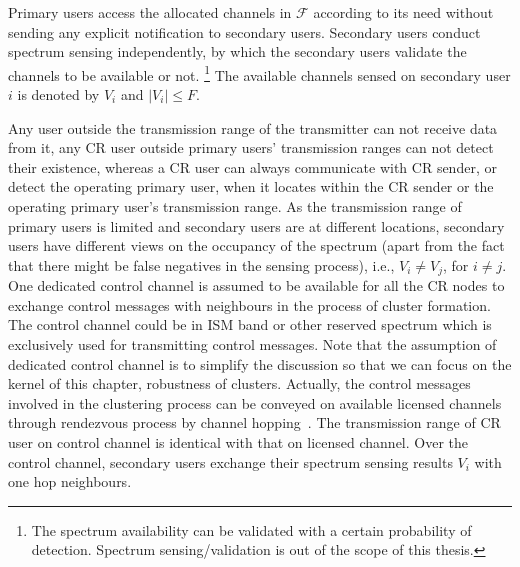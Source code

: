 Primary users access the allocated channels in $\mathcal{F}$ according to its need without sending any explicit notification to secondary users.
Secondary users conduct spectrum sensing independently, by which the secondary users validate the channels to be available or not. \footnote{The spectrum availability can be validated with a certain probability of detection. Spectrum sensing/validation is out of the scope of this thesis.}
The available channels sensed on secondary user $i$ is denoted by $V_i$ and $\vert V_i \vert \leq F$. %


Any user outside the transmission range of the transmitter can not receive data from it, \ie  any CR user outside primary users' transmission ranges can not detect their existence, whereas a CR user can always communicate with CR sender, or detect the operating primary user, when it locates within the CR sender or the operating primary user's transmission range.
As the transmission range of primary users is limited and secondary users are at different locations, secondary users have different views on the occupancy of the spectrum (apart from the fact that there might be false negatives in the sensing process), i.e., $V_i \neq V_j$, for $i \neq j$.
One dedicated control channel is assumed to be available for all the CR nodes to exchange control messages with neighbours in the process of cluster formation.
The control channel could be in ISM band or other reserved spectrum which is exclusively used for transmitting control messages.
Note that the assumption of dedicated control channel is to simplify the discussion so that we can focus on the kernel of this chapter, robustness of clusters.
Actually, the control messages involved in the clustering process can be conveyed on available licensed channels through rendezvous process by channel hopping~\cite{channelHopping_Rendezvous_2014, Gu_distributed_rendezvous_2014}. 
The transmission range of CR user on control channel is identical with that on licensed channel.
Over the control channel, secondary users exchange their spectrum sensing results $V_{i}$ with one hop neighbours. 

